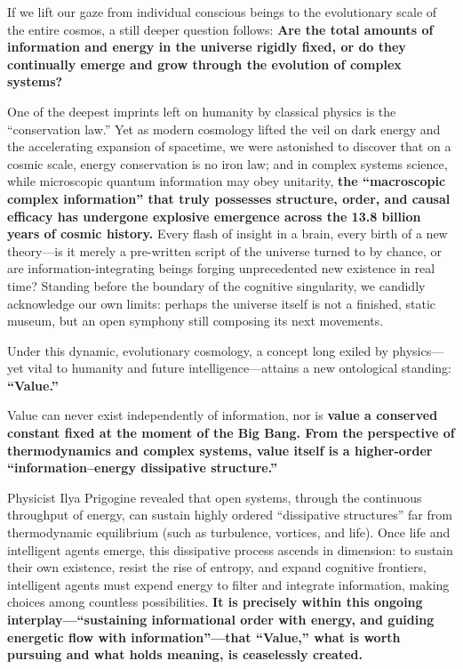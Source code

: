 \documentclass[11pt,a4paper]{article}
\begin{document}
If we lift our gaze from individual conscious beings to the evolutionary scale of the entire cosmos, a still deeper question follows: \textbf{Are the total amounts of information and energy in the universe rigidly fixed, or do they continually emerge and grow through the evolution of complex systems?}

One of the deepest imprints left on humanity by classical physics is the ``conservation law.'' Yet as modern cosmology lifted the veil on dark energy and the accelerating expansion of spacetime, we were astonished to discover that on a cosmic scale, energy conservation is no iron law; and in complex systems science, while microscopic quantum information may obey unitarity, \textbf{the ``macroscopic complex information'' that truly possesses structure, order, and causal efficacy has undergone explosive emergence across the 13.8 billion years of cosmic history.} Every flash of insight in a brain, every birth of a new theory---is it merely a pre-written script of the universe turned to by chance, or are information-integrating beings forging unprecedented new existence in real time? Standing before the boundary of the cognitive singularity, we candidly acknowledge our own limits: perhaps the universe itself is not a finished, static museum, but an open symphony still composing its next movements.

Under this dynamic, evolutionary cosmology, a concept long exiled by physics---yet vital to humanity and future intelligence---attains a new ontological standing: \textbf{``Value.''}

Value can never exist independently of information, nor is \textbf{value a conserved constant fixed at the moment of the Big Bang. From the perspective of thermodynamics and complex systems, value itself is a higher-order ``information--energy dissipative structure.''}

Physicist Ilya Prigogine revealed that open systems, through the continuous throughput of energy, can sustain highly ordered ``dissipative structures'' far from thermodynamic equilibrium (such as turbulence, vortices, and life). Once life and intelligent agents emerge, this dissipative process ascends in dimension: to sustain their own existence, resist the rise of entropy, and expand cognitive frontiers, intelligent agents must expend energy to filter and integrate information, making choices among countless possibilities. \textbf{It is precisely within this ongoing interplay---``sustaining informational order with energy, and guiding energetic flow with information''---that ``Value,'' what is worth pursuing and what holds meaning, is ceaselessly created.}
\end{document}
